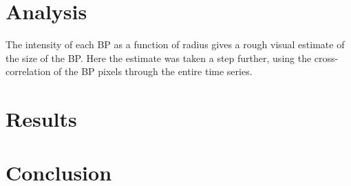 \documentclass[preprint2]{aastex}
\begin{document}
\section{Analysis}\label{analysis}
The intensity of each BP as a function of radius gives a rough visual estimate
of the size of the BP. Here the estimate was taken a step further, using the
cross-correlation of the BP pixels through the entire time series.

\section{Results}\label{results}
\section{Conclusion}\label{conclusion}


\end{document}
